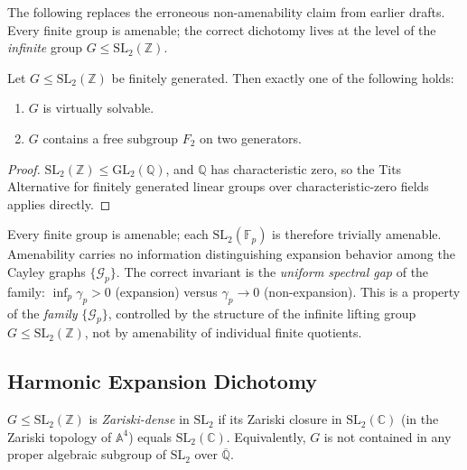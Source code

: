 The following replaces the erroneous non-amenability claim from earlier drafts.
Every finite group is amenable; the correct dichotomy lives at the level of the
\emph{infinite} group $G \leq \mathrm{SL}_2(\mathbb{Z})$.

\begin{lemma}
  \label{lem:tits}
  Let $G \leq \mathrm{SL}_2(\mathbb{Z})$ be finitely generated.
  Then exactly one of the following holds:
  \begin{enumerate}
    \item[\emph{(A)}] $G$ is virtually solvable.
    \item[\emph{(B)}] $G$ contains a free subgroup $F_2$ on two generators.
  \end{enumerate}
\end{lemma}

\begin{proof}
  $\mathrm{SL}_2(\mathbb{Z}) \leq \mathrm{GL}_2(\mathbb{Q})$, and $\mathbb{Q}$ has
  characteristic zero, so the Tits Alternative for finitely generated linear
  groups over characteristic-zero fields~\cite{tits1972free} applies directly.
\end{proof}

\begin{remark}
  \label{rem:amenability}
  Every finite group is amenable; each $\mathrm{SL}_2(\mathbb{F}_p)$ is therefore
  trivially amenable.  Amenability carries no information distinguishing
  expansion behavior among the Cayley graphs $\{\mathcal{G}_p\}$.
  The correct invariant is the \emph{uniform spectral gap} of the family:
  $\inf_p \gamma_p > 0$ (expansion) versus $\gamma_p \to 0$ (non-expansion).
  This is a property of the \emph{family} $\{\mathcal{G}_p\}$, controlled by the
  structure of the infinite lifting group $G \leq \mathrm{SL}_2(\mathbb{Z})$,
  not by amenability of individual finite quotients.
\end{remark}

\subsection{Harmonic Expansion Dichotomy}
\label{sec:harmonic:dichotomy}

\begin{definition}
  \label{def:zariski}
  $G \leq \mathrm{SL}_2(\mathbb{Z})$ is \emph{Zariski-dense} in $\mathrm{SL}_2$
  if its Zariski closure in $\mathrm{SL}_2(\mathbb{C})$ (in the Zariski topology of
  $\mathbb{A}^4$) equals $\mathrm{SL}_2(\mathbb{C})$.
  Equivalently, $G$ is not contained in any proper algebraic subgroup of
  $\mathrm{SL}_2$ over $\overline{\mathbb{Q}}$.
\end{definition}

